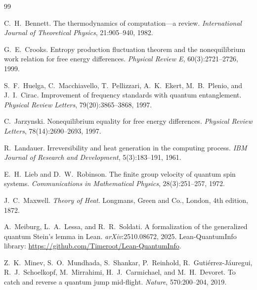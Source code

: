 \documentclass[11pt,a4paper]{article}
\theoremstyle{plain}
\theoremstyle{definition}
\theoremstyle{remark}
\begin{document}
\begin{thebibliography}{99}

C.~H.~Bennett.
\newblock The thermodynamics of computation---a review.
\newblock \textit{International Journal of Theoretical Physics}, 21:905--940,
  1982.

G.~E.~Crooks.
\newblock Entropy production fluctuation theorem and the nonequilibrium work
  relation for free energy differences.
\newblock \textit{Physical Review E}, 60(3):2721--2726, 1999.


S.~F.~Huelga, C.~Macchiavello, T.~Pellizzari, A.~K.~Ekert, M.~B.~Plenio, and
  J.~I.~Cirac.
\newblock Improvement of frequency standards with quantum entanglement.
\newblock \textit{Physical Review Letters}, 79(20):3865--3868, 1997.

C.~Jarzynski.
\newblock Nonequilibrium equality for free energy differences.
\newblock \textit{Physical Review Letters}, 78(14):2690--2693, 1997.

R.~Landauer.
\newblock Irreversibility and heat generation in the computing process.
\newblock \textit{IBM Journal of Research and Development}, 5(3):183--191, 1961.

E.~H.~Lieb and D.~W.~Robinson.
\newblock The finite group velocity of quantum spin systems.
\newblock \textit{Communications in Mathematical Physics}, 28(3):251--257, 1972.

J.~C.~Maxwell.
\newblock \textit{Theory of Heat}.
\newblock Longmans, Green and Co., London, 4th edition, 1872.

A.~Meiburg, L.~A.~Lessa, and R.~R.~Soldati.
\newblock A formalization of the generalized quantum {Stein's} lemma in {Lean}.
\newblock \textit{arXiv}:2510.08672, 2025.
\newblock Lean-QuantumInfo library:
  \url{https://github.com/Timeroot/Lean-QuantumInfo}.

Z.~K.~Minev, S.~O.~Mundhada, S.~Shankar, P.~Reinhold, R.~Guti\'{e}rrez-J\'{a}uregui,
  R.~J.~Schoelkopf, M.~Mirrahimi, H.~J.~Carmichael, and M.~H.~Devoret.
\newblock To catch and reverse a quantum jump mid-flight.
\newblock \textit{Nature}, 570:200--204, 2019.


\end{thebibliography}
\end{document}
